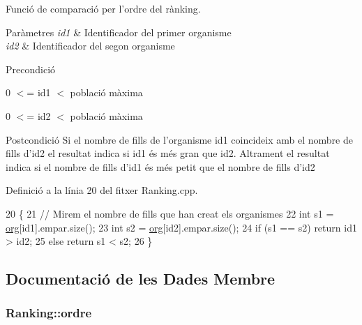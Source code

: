Funció de comparació per l'ordre del rànking. 


\begin{DoxyParams}{Paràmetres}
{\em id1} & Identificador del primer organisme \\
\hline
{\em id2} & Identificador del segon organisme \\
\hline
\end{DoxyParams}
\begin{DoxyPrecond}{Precondició}

\begin{DoxyItemize}
\item 0 $<$= {\ttfamily id1} $<$ població màxima
\item 0 $<$= {\ttfamily id2} $<$ població màxima
\end{DoxyItemize}
\end{DoxyPrecond}
\begin{DoxyPostcond}{Postcondició}
Si el nombre de fills de l'organisme {\ttfamily id1} coincideix amb el nombre de fills {\ttfamily d'id2} el resultat indica si {\ttfamily id1} és més gran que {\ttfamily id2}. Altrament el resultat indica si el nombre de fills {\ttfamily d'id1} és més petit que el nombre de fills {\ttfamily d'id2} 
\end{DoxyPostcond}


Definició a la línia 20 del fitxer Ranking.\-cpp.


\begin{DoxyCode}
20                                    \{
21     \textcolor{comment}{// Mirem el nombre de fills que han creat els organismes}
22     \textcolor{keywordtype}{int} s1 = \hyperlink{class_ranking_a89de97e7542e8989c241113a4ee2498f}{org}[id1].empar.size();
23     \textcolor{keywordtype}{int} s2 = \hyperlink{class_ranking_a89de97e7542e8989c241113a4ee2498f}{org}[id2].empar.size();
24     \textcolor{keywordflow}{if} (s1 == s2) \textcolor{keywordflow}{return} id1 > id2;
25     \textcolor{keywordflow}{else} \textcolor{keywordflow}{return} s1 < s2;
26 \}
\end{DoxyCode}


\subsection{Documentació de les Dades Membre}
\hypertarget{class_ranking_af527b6037110e19fda60fb4e100b7750}{
\subsubsection[{ordre}]{ Ranking\-::ordre\hspace{0.3cm}{\ttfamily [private]}}}\label{class_ranking_af527b6037110e19fda60fb4e100b7750}



